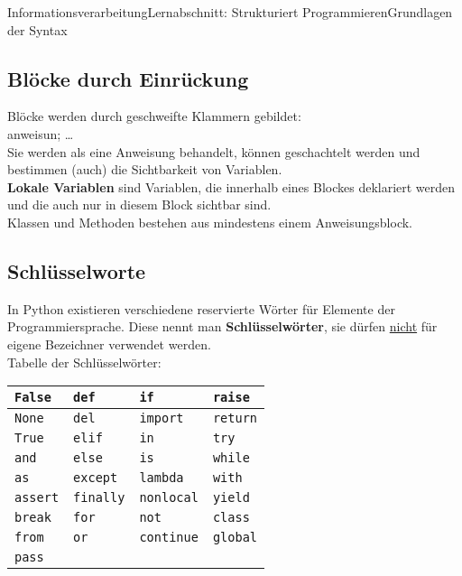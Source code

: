 \documentclass[11pt,oneside,openany,headings=optiontotoc,11pt,numbers=noenddot]{article}
\begin{document}
\begin{worksheet}{Informationsverarbeitung}{Lernabschnitt: Strukturiert Programmieren}{Grundlagen der Syntax}
		\subsection{Blöcke durch Einrückung}
		Blöcke werden durch geschweifte Klammern {} gebildet:\\
		{ anweisun; \ldots }\\
		Sie werden als eine Anweisung behandelt, können geschachtelt werden und bestimmen (auch) die Sichtbarkeit von Variablen.\\
		\textbf{Lokale Variablen} sind Variablen, die innerhalb eines Blockes deklariert werden und die auch nur in diesem Block sichtbar sind.\\
		Klassen und Methoden bestehen aus mindestens einem Anweisungsblock.
		
		\subsection{Schlüsselworte}
		In Python existieren verschiedene reservierte Wörter für Elemente der Programmiersprache. Diese nennt man \textbf{Schlüsselwörter}, sie dürfen \underline{nicht} für eigene Bezeichner verwendet werden.\\
		\newpage
		\noindent
		Tabelle der Schlüsselwörter:\\
		\par\noindent
		\begin{tabularx}{\textwidth}{|X|X|X|X|}
			\hline
			{\lstinline[style=Python]{False}} & {\lstinline[style=Python]{def}} & {\lstinline[style=Python]{if}} & {\lstinline[style=Python]{raise}}\\
			\hline
			{\lstinline[style=Python]{None}} & {\lstinline[style=Python]{del}} & {\lstinline[style=Python]{import}} & {\lstinline[style=Python]{return}}\\
			\hline
			{\lstinline[style=Python]{True}} & {\lstinline[style=Python]{elif}} & {\lstinline[style=Python]{in}} & {\lstinline[style=Python]{try}}\\
			\hline
			{\lstinline[style=Python]{and}} & {\lstinline[style=Python]{else}} & {\lstinline[style=Python]{is}} & {\lstinline[style=Python]{while}}\\
			\hline
			{\lstinline[style=Python]{as}} & {\lstinline[style=Python]{except}} & {\lstinline[style=Python]{lambda}} & {\lstinline[style=Python]{with}}\\
			\hline
			{\lstinline[style=Python]{assert}} & {\lstinline[style=Python]{finally}} & {\lstinline[style=Python]{nonlocal}} & {\lstinline[style=Python]{yield}}\\
			\hline
			{\lstinline[style=Python]{break}} & {\lstinline[style=Python]{for}} & {\lstinline[style=Python]{not}} & {\lstinline[style=Python]{class}}\\
			\hline
			{\lstinline[style=Python]{from}} & {\lstinline[style=Python]{or}} & {\lstinline[style=Python]{continue}} & {\lstinline[style=Python]{global}}\\
			\hline
			{\lstinline[style=Python]{pass}} & \multicolumn{3}{c|}{} \\
			\hline
		\end{tabularx}

\end{worksheet}
\end{document}
